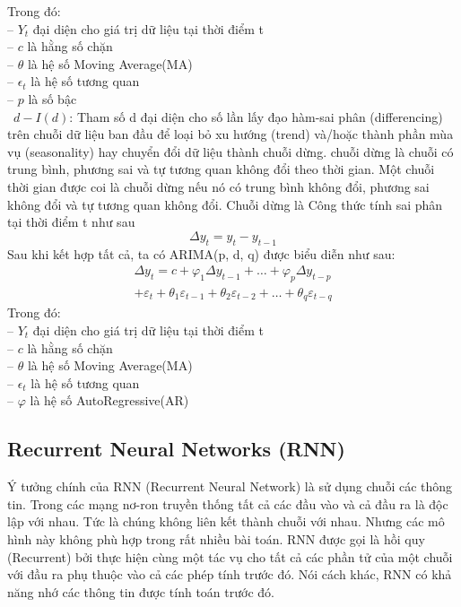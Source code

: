 \documentclass[conference]{IEEEtran}
\begin{document}
Trong đó: \\
\indent -- \(Y_t\) đại diện cho giá trị dữ liệu tại thời điểm t\\
\indent -- \(c\) là hằng số chặn\\
\indent -- \(\theta\) là hệ số Moving Average(MA)\\
\indent -- \(\epsilon_t\) là hệ số tương quan\\
\indent -- \(p\) là số bậc \\

\indent\textbullet\  \(d-I(d)\): Tham số d đại diện cho số lần lấy đạo hàm-sai phân (differencing) trên chuỗi dữ liệu ban đầu để loại bỏ xu hướng (trend) và/hoặc thành phần mùa vụ (seasonality) hay chuyển đổi dữ liệu thành chuỗi dừng. chuỗi dừng là chuỗi có trung bình, phương sai và tự tương quan không đổi theo thời gian. Một chuỗi thời gian được coi là chuỗi dừng nếu nó có trung bình không đổi, phương sai không đổi và tự tương quan không đổi. Chuỗi dừng là Công thức tính sai phân tại thời điểm t như sau
\vspace{-5mm}
\[
    \Delta y_t = y_t - y_{t-1}
\]
Sau khi kết hợp tất cả, ta có ARIMA(p, d, q) được biểu diễn như sau:
\vspace{-4mm}
\begin{multline}
    \Delta y_t = c + \varphi_1 \Delta y_{t-1} + \ldots + \varphi_p \Delta y_{t-p} \\
    + \varepsilon_t + \theta_1 \varepsilon_{t-1} + \theta_2 \varepsilon_{t-2}
    + \ldots + \theta_q \varepsilon_{t-q}
\end{multline}
Trong đó: \\
\indent -- \(Y_t\) đại diện cho giá trị dữ liệu tại thời điểm t\\
\indent -- \(c\) là hằng số chặn\\
\indent -- \(\theta\) là hệ số Moving Average(MA)\\
\indent -- \(\epsilon_t\) là hệ số tương quan\\
\indent -- \(\varphi\) là hệ số AutoRegressive(AR)\\
\vspace{-7mm}
\subsection{Recurrent Neural Networks (RNN)}
Ý tưởng chính của RNN (Recurrent Neural Network) là sử dụng chuỗi các thông tin. Trong các mạng nơ-ron truyền thống tất cả các đầu vào và cả đầu ra là độc lập với nhau. Tức là chúng không liên kết thành chuỗi với nhau. Nhưng các mô hình này không phù hợp trong rất nhiều bài toán. RNN được gọi là hồi quy (Recurrent) bởi thực hiện cùng một tác vụ cho tất cả các phần tử của một chuỗi với đầu ra phụ thuộc vào cả các phép tính trước đó. Nói cách khác, RNN có khả năng nhớ các thông tin được tính toán trước đó.
\end{document}
